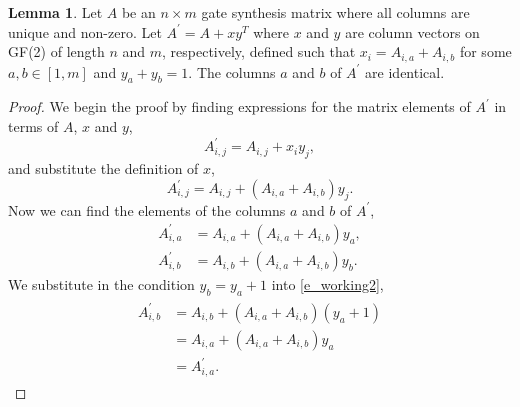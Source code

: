 \documentclass{article}
\theoremstyle{definition}
\theoremstyle{problem}
\theoremstyle{lemma}
\newtheorem{lemma}{Lemma}[section]
\begin{document}
		\theoremstyle{lemma}
		\begin{lemma}{}
			Let $A$ be an $n\times m$ gate synthesis matrix where all columns are unique and non-zero. Let $A^\prime = A + xy^T$ where $x$ and $y$ are column vectors on GF(2) of length $n$ and $m$, respectively, defined such that $x_i = A_{i,a} + A_{i,b}$ for some $a,b\in \left[1,m\right]$ and $y_a + y_b = 1$. The columns $a$ and $b$ of $A^\prime$ are identical.
		\end{lemma}
		\begin{proof}
			We begin the proof by finding expressions for the matrix elements of $A^\prime$ in terms of $A$, $x$ and $y$,
			\begin{equation}
			A^\prime_{i,j} = A_{i,j} + x_i y_j,
			\end{equation}
			and substitute the definition of $x$,
			\begin{equation}
			A^\prime_{i,j} = A_{i,j} + (A_{i,a}+A_{i,b}) y_j.
			\end{equation}
			Now we can find the elements of the columns $a$ and $b$ of $A^\prime$,
			\begin{align}
			A^\prime_{i,a} &= A_{i,a} + (A_{i,a}+A_{i,b}) y_a,\\
			A^\prime_{i,b} &= A_{i,b} + (A_{i,a}+A_{i,b}) y_b.
			\label{e_working2}
			\end{align}
			We substitute in the condition $y_b = y_a + 1$ into \ref{e_working2},
			\begin{align}
			\begin{split}
			A^\prime_{i,b} &= A_{i,b} + (A_{i,a}+A_{i,b}) (y_a + 1) \\
			&= A_{i,a} + (A_{i,a}+A_{i,b})y_a \\
			& = A^\prime_{i,a}.
			\end{split}			
			\end{align}
		\end{proof}
	
		
	
		
	
		
	
\end{document}
